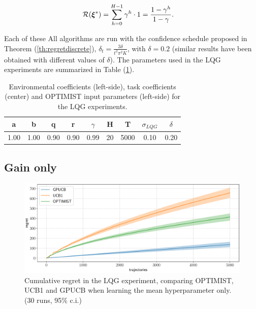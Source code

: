 \begin{align}
\mathcal{R}(\boldsymbol{\xi}^*)
&= \sum_{h=0}^{H-1}\gamma^h\cdot 1 = \frac{1-\gamma^h}{1-\gamma}.
\end{align}
 
Each of these  All algorithms are run with the confidence schedule proposed in Theorem (\ref{th:regretdiscrete}), \ie $\delta_t = \frac{3\delta}{t^2\pi^2K}$, with $\delta=0.2$ (similar results have been obtained with different values of $\delta$). The parameters used in the \gls{LQG} experiments are summarized in Table (\ref{tab:LQGcoeff}).


\begin{table}[t!]
\centering
\begin{tabular}{cccc|cccc|c} 
\toprule
a & b & q & r & $\gamma$ & H & T & $\sigma_{LQG}$ & $\delta$\\ 
\midrule
1.00 & 1.00 & 0.90 & 0.90 & 0.99 & 20 & 5000 & 0.10 & 0.20\\
\bottomrule
\end{tabular}
\caption{Environmental coefficients (left-side), task coefficients (center) and \gls{OPTIMIST} input parameters (left-side) for the \gls{LQG} experiments.}
\label{tab:LQGcoeff}
\end{table}


\subsection{Gain only}

\begin{figure}[t!]
\centering
\includegraphics[width=\textwidth,height=\textheight,keepaspectratio]{Images/LQGcomparison.pdf}
\caption{Cumulative regret in
the \gls{LQG} experiment, comparing
\gls{OPTIMIST}, \gls{UCB}1 and \gls{GPUCB} when learning the mean hyperparameter only.
(30 runs, 95\% c.i.)}
\label{fig:LQGcomparison}
\end{figure}

